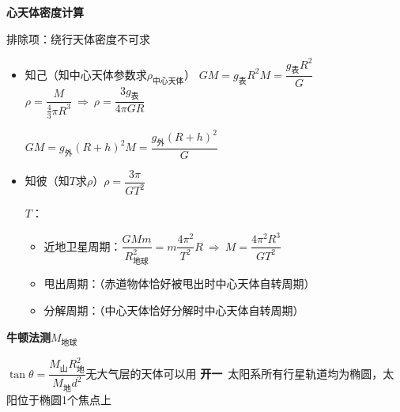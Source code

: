 \textbf{心天体密度计算}%


排除项：绕行天体密度不可求

\begin{itemize}
\item 知己（知中心天体参数求$\rho_{\text{中心天体}}$）\quad
$GM=g_{\text{表}}R^{2}$\quad $M=\dfrac{g_{\text{表}}R^{2}}{G}$\quad $\rho=\dfrac{M}{\frac{4}{3}\pi R^{3}}\ \Rightarrow\ \rho=\dfrac{3g_{\text{表}}}{4\pi GR}$

\quad $GM=g_{\text{外}}(R+h)^{2}$\quad $M=\dfrac{g_{\text{外}}(R+h)^{2}}{G}$%
\item 知彼（知$T$求$\rho$）\quad $\rho=\dfrac{3\pi}{GT^{2}}$\quad {}\quad {}

$T$：
\begin{itemize}
\item 近地卫星周期：$\dfrac{GMm}{R_{\text{地球}}^{2}}=m\dfrac{4\pi^{2}}{T^{2}}R\ \Rightarrow\ M=\dfrac{4\pi^{2}R^{3}}{GT^{2}}$%
\item 甩出周期：（赤道物体恰好被甩出时中心天体自转周期）
\item 分解周期：（中心天体恰好分解时中心天体自转周期）
\end{itemize}
\end{itemize}
\textbf{牛顿法测$M_{\text{地球}}$}


$\tan\theta=\dfrac{M_{\text{山}}R_{\text{地}}^{2}}{M_{\text{地}}d^{2}}$\qquad 无大气层的天体可以用
\textbf{开一}\ 太阳系所有行星轨道均为椭圆，太阳位于椭圆1个焦点上%

